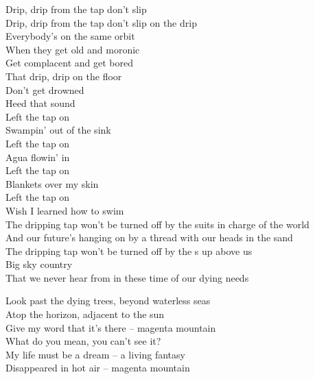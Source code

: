 Drip, drip from the tap don't slip \\
Drip, drip from the tap don't slip on the drip \\

Everybody's on the same orbit \\
When they get old and moronic \\
Get complacent and get bored \\
That drip, drip on the floor \\

Don't get drowned \\
Heed that sound \\

Left the tap on \\
Swampin' out of the sink \\
Left the tap on \\
Agua flowin' in \\
Left the tap on \\
Blankets over my skin \\
Left the tap on \\
Wish I learned how to swim \\

The dripping tap won't be turned off by the suits in charge of the world \\
And our future's hanging on by a thread with our heads in the sand \\
The dripping tap won't be turned off by the s up above us \\
Big sky country \\
That we never hear from in these time of our dying needs \\




Look past the dying trees, beyond waterless seas \\
Atop the horizon, adjacent to the sun \\
Give my word that it's there -- magenta mountain \\

What do you mean, you can't see it? \\
My life must be a dream -- a living fantasy \\
Disappeared in hot air -- magenta mountain \\


